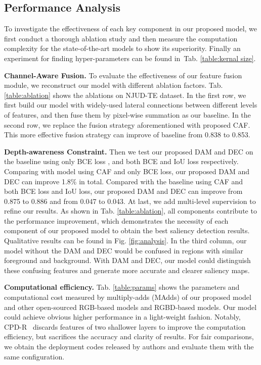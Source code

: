 \documentclass[sigconf]{acmart}
\newcommand{\figref}[1]{Fig. \ref{#1}}
\newcommand{\tabref}[1]{Tab. \ref{#1}}
\begin{document}
\subsection{Performance Analysis}

To investigate the effectiveness of each key component in our proposed model, we first conduct a thorough ablation study and then measure the computation complexity for the state-of-the-art models to show its superiority. Finally an experiment for finding hyper-parameters can be found in~\tabref{table:kernal size}.

\textbf{Channel-Aware Fusion.} To evaluate the effectiveness of our feature fusion module, we reconstruct our model with different ablation factors. \tabref{table:ablation} shows the ablations on NJUD-TE dataset. In the first row, we first build our model with widely-used lateral connections between different levels of features, and then fuse them by pixel-wise summation as our baseline. In the second row, we replace the fusion strategy aforementioned with proposed CAF. This more effective fusion strategy can improve  of baseline from 0.838 to 0.853.



\textbf{Depth-awareness Constraint.} Then we test our proposed DAM and DEC on the baseline using only BCE loss , and both BCE and IoU loss respectively. Comparing with model using CAF and only BCE loss, our proposed DAM and DEC can improve  1.8\% in total. Compared with the baseline using CAF and both BCE loss and IoU loss, our proposed DAM and DEC can improve  from 0.875 to 0.886 and  from 0.047 to 0.043. At last, we add multi-level supervision to refine our results. As shown in \tabref{table:ablation}, all components contribute to the performance improvement, which demonstrates the necessity of each component of our proposed model to obtain the best saliency detection results.
Qualitative results can be found in \figref{fig:analysis}. In the third column, our model without the DAM and DEC would be confused in regions with similar foreground and background. With DAM and DEC, our model could distinguish these confusing features and generate more accurate and clearer saliency maps.

\textbf{Computational efficiency.} \tabref{table:params} shows the parameters and computational cost measured by multiply-adds (MAdds) of our proposed model and other open-sourced RGB-based models and RGBD-based models. Our model could achieve obvious higher performance in a light-weight fashion. Notably, CPD-R~\cite{wu2019cascaded} discards features of two shallower layers to improve the computation efficiency, but sacrifices the accuracy and clarity of results. For fair comparisons, we obtain the deployment codes released by authors and evaluate them with the same configuration.
\end{document}
